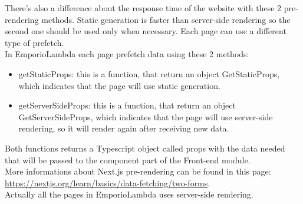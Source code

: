 There's also a difference about the response time of the website with these 2 pre-rendering methods. Static generation is faster than server-side rendering so the second one should be used only when necessary. Each page can use a different type of prefetch.\\
In EmporioLambda each page prefetch data using these 2 methods:
\begin{itemize}
\item getStaticProps: this is a function, that return an object GetStaticProps, which indicates that the page will use static generation.
\item getServerSideProps: this is a function, that return an object GetServerSideProps, which indicates that the page will use server-side rendering, so it will render again after receiving new data.
\end{itemize}
Both functions returns a Typescript object called props with the data needed that will be passed to the component part of the Front-end module.\\
More informations about Next.js pre-rendering can be found in this page: \url{https://nextjs.org/learn/basics/data-fetching/two-forms}.\\
Actually all the pages in EmporioLambda uses server-side rendering.